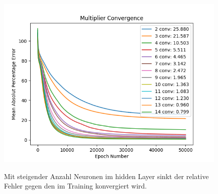 \begin{figure}
	\centering
	\includegraphics[scale=0.7]{learning/img/loss.png}
	\label{fig:mst_loss}
	\caption{Mit steigender Anzahl Neuronen im hidden Layer sinkt der relative Fehler gegen den im Training konvergiert wird.}
\end{figure}

